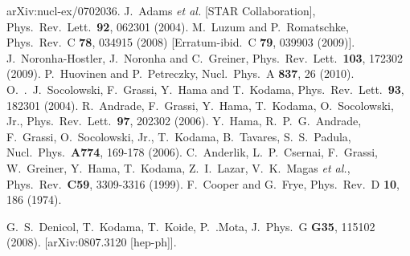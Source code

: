 \documentclass[aps,article]{revtex4}
\begin{document}
\begin{thebibliography}{99}
  arXiv:nucl-ex/0702036.
  J.~Adams {\it et al.}  [STAR Collaboration],
  Phys.\ Rev.\ Lett.\  {\bf 92}, 062301 (2004).
  M.~Luzum and P.~Romatschke,
  Phys.\ Rev.\  C {\bf 78}, 034915 (2008)
  [Erratum-ibid.\  C {\bf 79}, 039903 (2009)].
  J.~Noronha-Hostler, J.~Noronha and C.~Greiner,
  Phys.\ Rev.\ Lett.\  {\bf 103}, 172302 (2009).
  P.~Huovinen and P.~Petreczky,
  Nucl.\ Phys.\  A {\bf 837}, 26 (2010).
  O.~.~J.~Socolowski, F.~Grassi, Y.~Hama and T.~Kodama,
  Phys.\ Rev.\ Lett.\  {\bf 93}, 182301 (2004).
  R.~Andrade, F.~Grassi, Y.~Hama, T.~Kodama, O.~Socolowski, Jr.,
  Phys.\ Rev.\ Lett.\  {\bf 97}, 202302 (2006).
  Y.~Hama, R.~P.~G.~Andrade, F.~Grassi, O.~Socolowski, Jr., T.~Kodama, B.~Tavares, S.~S.~Padula,
  Nucl.\ Phys.\  {\bf A774}, 169-178 (2006).
  C.~Anderlik, L.~P.~Csernai, F.~Grassi, W.~Greiner, Y.~Hama, T.~Kodama, Z.~I.~Lazar, V.~K.~Magas {\it et al.},
  Phys.\ Rev.\  {\bf C59}, 3309-3316 (1999).
  F.\ Cooper and G.\ Frye, Phys.\ Rev.\ D {\bf 10}, 186 (1974).

  G.~S.~Denicol, T.~Kodama, T.~Koide, P.~.Mota,
  J.\ Phys.\ G {\bf G35}, 115102 (2008).
  [arXiv:0807.3120 [hep-ph]].


\end{thebibliography}
\end{document}
